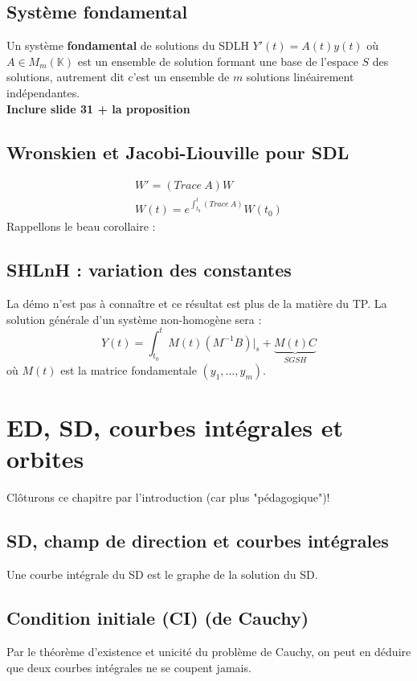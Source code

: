 \documentclass[british,french,11pt, a4paper, openany]{book}
\begin{document}
\subsection{Système fondamental}
Un système \textbf{fondamental} de solutions du SDLH $Y'(t) = A(t)y(t)$ où $A \in M_m(\mathbb{K})$ est un ensemble de solution formant une base de l'espace $S$ des solutions, autrement dit c'est un ensemble de $m$ solutions linéairement indépendantes.\\
\textbf{Inclure slide 31  + la proposition}
		
\subsection{Wronskien et Jacobi-Liouville pour SDL}
\begin{eqnarray}
	W' = (Trace\ A)W\\
	W(t) = e^{\int_{t_0}^t (Trace\ A)}W(t_0)
\end{eqnarray}
Rappellons le beau corollaire :\\
		
\subsection{SHLnH : variation des constantes}
La démo n'est pas à connaître et ce résultat est plus de la matière du TP. La solution générale d'un système non-homogène sera :
\begin{equation}
	Y(t) = \int_{t_0}^t M(t)(M^{-1}B)|_s + \underbrace{M(t)C}_{SGSH}
\end{equation}
où $M(t)$ est la matrice fondamentale $(y_1,\dots,y_m)$.
		
\setcounter{section}{0}
\section{ED, SD, courbes intégrales et orbites}
Clôturons ce chapitre par l'introduction (car plus "pédagogique")! 
\subsection{SD, champ de direction et courbes intégrales}
Une courbe intégrale du SD est le graphe de la solution du SD.
		
\subsection{Condition initiale (CI) (de Cauchy)}
Par le théorème d'existence et unicité du problème de Cauchy, on peut en déduire que deux courbes intégrales ne se coupent jamais.
		
\end{document}
